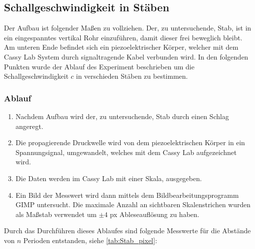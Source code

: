 \documentclass[11pt]{scrartcl}
\begin{document}
\subsection{Schallgeschwindigkeit in Stäben}
\label{ssec:Stab_versuch}

Der Aufbau ist folgender Maßen zu vollziehen. Der, zu untersuchende,
Stab, ist in ein eingespanntes vertikal Rohr einzuführen, damit
dieser frei beweglich bleibt. Am unteren Ende befindet sich ein 
piezoelektrischer Körper, welcher mit dem Cassy Lab System durch
signaltragende Kabel verbunden wird. 
In den folgenden Punkten wurde der Ablauf des Experiment beschrieben um
die Schallgeschwindigkeit $c$ in verschieden Stäben zu bestimmen.

\subsubsection{Ablauf}
\begin{enumerate}
    \item Nachdem Aufbau wird der, zu untersuchende, Stab durch einen
        Schlag angeregt.
    \item Die propagierende Druckwelle wird von dem piezoelektrischen
        Körper in ein Spannungsignal, umgewandelt, welches
        mit dem Cassy Lab aufgezeichnet wird.
    \item Die Daten werden im Cassy Lab mit einer Skala, ausgegeben.
    \item Ein Bild der Messwert wird dann mittels dem Bildbearbeitungsprogramm
        GIMP untersucht. Die maximale Anzahl an sichtbaren Skalenstrichen 
        wurden als Maßstab verwendet um $\pm 4$ px Ableseauflösung zu
        haben.
\end{enumerate}

Durch das Durchführen dieses Ablaufes sind folgende Messwerte
für die Abstände von $n$ Perioden entstanden, siehe \autoref{tab:Stab_pixel}:
\end{document}
